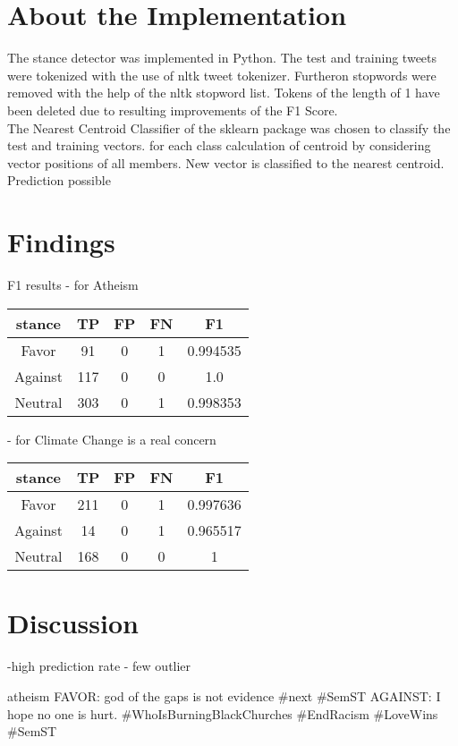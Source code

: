 \documentclass[a4paper,12pt,twoside]{article}
\begin{document}
\section{About the Implementation}
The stance detector was implemented in Python. The test and training tweets were tokenized with the use of nltk tweet tokenizer. Furtheron stopwords were removed with the help of the nltk stopword list.
Tokens of the length of 1 have been deleted due to resulting improvements of the F1 Score. \\
The Nearest Centroid Classifier  of the sklearn package was chosen to classify the test and training vectors.
for each class calculation of centroid by considering vector positions of all members.
New vector is classified to the nearest centroid. Prediction possible



\section{Findings}

F1 results
- for Atheism

\begin{tabular}{c|ccc|c}
stance & TP & FP & FN & F1\\ \hline
Favor & 91 & 0 & 1 & 0.994535\\
Against & 117 & 0 & 0 & 1.0\\
Neutral &  303 & 0 & 1 & 0.998353\\
\end{tabular}



- for Climate Change is a real concern \\
\begin{tabular}{c|ccc|c}
stance & TP & FP & FN & F1\\ \hline
Favor & 211 & 0 & 1 & 0.997636\\
Against & 14 & 0 & 1 & 0.965517 \\
Neutral & 168 & 0 & 0 & 1 \\
\end{tabular}



\section{Discussion}

-high prediction rate
- few outlier

atheism
FAVOR: god of the gaps is not evidence #next #SemST
AGAINST: I hope no one is hurt. #WhoIsBurningBlackChurches #EndRacism #LoveWins #SemST
\end{document}
